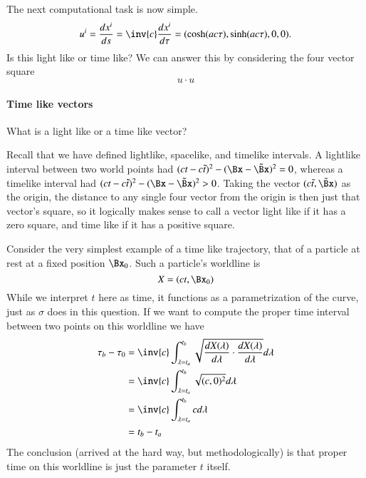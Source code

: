 {%
The next computational task is now simple.
\begin{equation}\label{eqn:relativisticElectrodynamicsT2:77}
u^i
= \frac{dx^i}{ds}
= \inv{c} \frac{dx^i}{d\tau}
= ( \cosh( a c \tau ), \sinh( a c \tau ), 0, 0).
\end{equation}
%
Is this light like or time like?  We can answer this by considering the four vector square
%
\begin{equation}\label{eqn:relativisticElectrodynamicsT2:80}
u \cdot u
\end{equation}
%
\paragraph{Time like vectors}
%
What is a light like or a time like vector?

Recall that we have defined lightlike, spacelike, and timelike intervals.  A lightlike interval between two world points had \((ct - c\tilde{t})^2 - (\Bx -\tilde{\Bx})^2 = 0\), whereas a timelike interval had \((ct - c\tilde{t})^2 - (\Bx -\tilde{\Bx})^2 > 0\).  Taking the vector \((c \tilde{t}, \tilde{\Bx})\) as the origin, the distance to any single four vector from the origin is then just that vector's square, so it logically makes sense to call a vector light like if it has a zero square, and time like if it has a positive square.

Consider the very simplest example of a time like trajectory, that of a particle at rest at a fixed position \(\Bx_0\).  Such a particle's worldline is
%
\begin{equation}\label{eqn:relativisticElectrodynamicsT2:71}
X = ( c t, \Bx_0 )
\end{equation}
%
While we interpret \(t\) here as time, it functions as a parametrization of the curve, just as \(\sigma\) does in this question.  If we want to compute the proper time interval between two points on this worldline we have
%
\begin{equation}\label{eqn:relativisticElectrodynamicsT2:2140}
\begin{aligned}
\tau_b - \tau_0
&=
\inv{c} \int_{\lambda = t_a}^{t_b} \sqrt{ \frac{dX(\lambda)}{d\lambda} \cdot \frac{dX(\lambda)}{d\lambda} } d\lambda \\
&=
\inv{c} \int_{\lambda = t_a}^{t_b} \sqrt{ (c, 0)^2 } d\lambda \\
&=
\inv{c} \int_{\lambda = t_a}^{t_b} c d\lambda \\
&= t_b - t_a
\end{aligned}
\end{equation}
%
The conclusion (arrived at the hard way, but methodologically) is that proper time on this worldline is just the parameter \(t\) itself.

}

